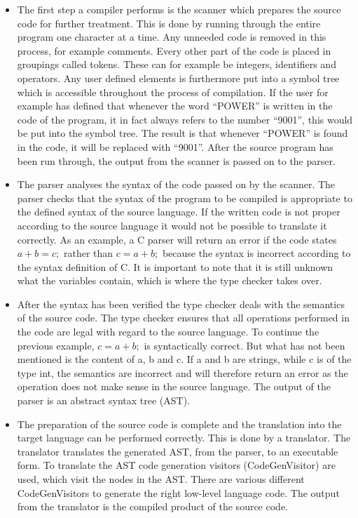 \begin{itemize}
	\item The first step a compiler performs is the scanner which prepares the source code for further treatment. This is done by running through the entire program one character at a time. Any unneeded code is removed in this process, for example comments.  Every other part of the code is placed in groupings called tokens. These can for example be integers, identifiers and operators. Any user defined elements is furthermore put into a symbol tree which is accessible throughout the process of compilation. If the user for example has defined that whenever the word ``POWER'' is written in the code of the program, it in fact always refers to the number ``9001'', this would be put into the symbol tree. The result is that whenever ``POWER'' is found in the code, it will be replaced with ``9001''. After the source program has been run through, the output from the scanner is passed on to the parser.
	
	\item The parser analyses the syntax of the code passed on by the scanner. The parser checks that the syntax of the program to be compiled is appropriate to the defined syntax of the source language. If the written code is not proper according to the source language it would not be possible to translate it correctly. As an example, a C parser will return an error if the code states $a + b = c;$ rather than $c = a + b;$ because the syntax is incorrect according to the syntax definition of C. It is important to note that it is still unknown what the variables contain, which is where the type checker takes over.

	\item After the syntax has been verified the type checker deals with the semantics of the source code. The type checker ensures that all operations performed in the code are legal with regard to the source language. To continue the previous example, $c = a + b;$ is syntactically correct. But what has not been mentioned is the content of a, b and c. If a and b are strings, while c is of the type int, the semantics are incorrect and will therefore return an error as the operation does not make sense in the source language. The output of the parser is an abstract syntax tree (AST). 

	\item The preparation of the source code is complete and the translation into the target language can be performed correctly. This is done by a translator. The translator translates the generated AST, from the parser, to an executable form. To translate the AST code generation visitors (CodeGenVisitor) are used, which visit the nodes in the AST. There are various different CodeGenVisitors to generate the right low-level language code. The output from the translator is the compiled product of the source code.
\end{itemize}

